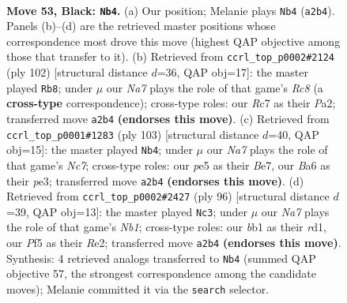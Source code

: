 \documentclass[11pt]{article}
\begin{document}
\clearpage

\begin{figure}[p]\centering
\begin{subfigure}{0.46\textwidth}\centering
\resizebox{\linewidth}{!}{%
\newchessgame
\chessboard[
  setfen={6k1/2r2p1p/b5p1/4Pp2/5P2/7N/n4KPP/1B6 b - - 1 53},
  showmover=false,
  pgfstyle=straightmove, color=movearrow, markmove={a2-b4}
]}
\caption{}
\end{subfigure}\hfill
\begin{subfigure}{0.46\textwidth}\centering
\resizebox{\linewidth}{!}{%
\newchessgame
\chessboard[
  setfen={2R5/3b1pk1/p3n1p1/7p/4PP1P/4KP2/P7/8 w - - 28 52},
  showmover=false,
  pgfstyle=straightmove, color=movearrow, markmove={c8-b8}
]}
\caption{}
\end{subfigure}
\\[4pt]
\begin{subfigure}{0.46\textwidth}\centering
\resizebox{\linewidth}{!}{%
\newchessgame
\chessboard[
  setfen={8/4bpkp/6p1/8/4B3/1P2P2P/2n1NP2/6K1 b - - 1 52},
  showmover=false,
  pgfstyle=straightmove, color=movearrow, markmove={c2-b4}
]}
\caption{}
\end{subfigure}\hfill
\begin{subfigure}{0.46\textwidth}\centering
\resizebox{\linewidth}{!}{%
\newchessgame
\chessboard[
  setfen={8/5ppk/7p/p4b2/7P/1P4P1/P3RP1K/1N1r4 w - - 4 49},
  showmover=false,
  pgfstyle=straightmove, color=movearrow, markmove={b1-c3}
]}
\caption{}
\end{subfigure}
\caption{\textbf{Move 53, Black: \texttt{Nb4}.} (a) Our position; Melanie plays \texttt{Nb4} (\texttt{a2b4}). Panels (b)--(d) are the retrieved master positions whose correspondence most drove this move (highest QAP objective among those that transfer to it). (b) Retrieved from \texttt{ccrl\_top\_p0002\#2124} (ply 102) [structural distance $d$=36, QAP obj=17]: the master played \texttt{Rb8}; under $\mu$ our \emph{Na7} plays the role of that game's \emph{Rc8} (a \textbf{cross-type} correspondence); cross-type roles: our \emph{R}c7 as their \emph{P}a2; transferred move \texttt{a2b4} \textbf{(endorses this move)}. (c) Retrieved from \texttt{ccrl\_top\_p0001\#1283} (ply 103) [structural distance $d$=40, QAP obj=15]: the master played \texttt{Nb4}; under $\mu$ our \emph{Na7} plays the role of that game's \emph{Nc7}; cross-type roles: our \emph{p}e5 as their \emph{B}e7, our \emph{B}a6 as their \emph{p}e3; transferred move \texttt{a2b4} \textbf{(endorses this move)}. (d) Retrieved from \texttt{ccrl\_top\_p0002\#2427} (ply 96) [structural distance $d$=39, QAP obj=13]: the master played \texttt{Nc3}; under $\mu$ our \emph{Na7} plays the role of that game's \emph{Nb1}; cross-type roles: our \emph{b}b1 as their \emph{r}d1, our \emph{P}f5 as their \emph{R}e2; transferred move \texttt{a2b4} \textbf{(endorses this move)}. Synthesis: 4 retrieved analogs transferred to \texttt{Nb4} (summed QAP objective 57, the strongest correspondence among the candidate moves); Melanie committed it via the \texttt{search} selector.}
\label{fig:thought-m105}
\end{figure}
\end{document}

